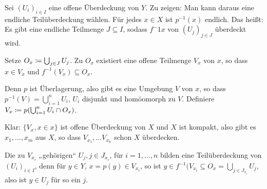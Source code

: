 \documentclass{article}
\begin{document}
Sei $(U_i)_{i\in I}$ eine offene Überdeckung von $Y$. Zu zeigen: Man kann daraus eine endliche Teilüberdeckung wählen. Für jedes $x\in X$ ist $p^{-1}(x)$ endlich. Das heißt: Es gibt eine endliche Teilmenge $J\subseteq I$, sodass $f^-1{x}$ von $(U_j)_{j\in J}$ überdeckt wird.

Setze $O_x \mathrel{\mbox{$\coloneqq$}} \bigcup_{j\in J} U_j$. Zu $O_x$ existiert eine offene Teilmenge $V_x$ von $x$, so dass $x\in V_x$ und $f^{-1}(V_x)\subseteq O_x$.

Denn $p$ ist Überlagerung, also gibt es eine Umgebung $V$ von $x$, so dass $p^{-1}(V) = \bigcup_{i=1}^n U_i$, $U_i$ disjunkt und homöomorph zu $V$. Definiere $V_x \mathrel{\mbox{$\coloneqq$}} p(\bigcup_{i=1}^n U_i \cap O_x)$.

Klar: $\{V_x, x\in x\}$ ist offene Überdeckung von $X$ und $X$ ist kompakt, also gibt es $x_1,\ldots,x_m$ aus $X$, so dass $V_{x_1},\ldots V_{x_n}$ schon $X$ überdecken.

Die zu $V_{x_i}$ „gehörigen“ $U_j, j\in J_{x_i}$, für $i=1,\ldots,n$ bilden eine Teilüberdeckung von $(U_i)_{i\in I}$, denn für $y\in Y$, $x=p(y)\in V_{x_i}$, so ist $y\in f^{-1}(V_{x_i} \subseteq O_x = \bigcup_{j\in J_{x_i}} U_j$, also ist $y\in U_j$ für so ein $j$.
\end{document}
